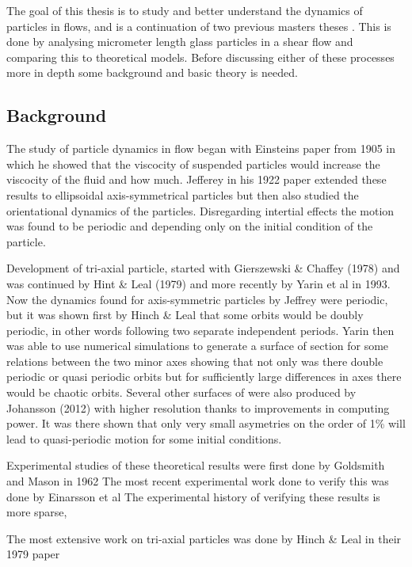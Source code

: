 


The goal of this thesis is to study and better understand the dynamics of particles in flows, and is a continuation of two previous masters theses \cite{AntonThesis}\cite{JonasThesis}. This is done by analysing micrometer length glass particles in a shear flow and comparing this to theoretical models. Before discussing either of these processes more in depth some background and basic theory is needed.

\subsection{Background}
The study of particle dynamics in flow began with Einsteins paper from 1905 \cite{Einstein} in which he showed that the viscocity of suspended particles would increase the viscocity of the fluid and how much. Jefferey in his 1922 paper \cite{Jeffrey} extended these results to ellipsoidal axis-symmetrical particles but then also studied the orientational dynamics of the particles. Disregarding intertial effects the motion was found to be periodic and depending only on the initial condition of the particle.

Development of tri-axial particle, started with Gierszewski \& Chaffey (1978)\cite{Chaffey} and was continued by Hint \& Leal (1979) and more recently by Yarin et al in 1993\cite{Yarin}. 
Now the dynamics found for axis-symmetric particles by Jeffrey were periodic, but it was shown first by Hinch \& Leal that some orbits would be doubly periodic, in other words following two separate independent periods. 
Yarin then was able to use numerical simulations to generate a surface of section \cite{SurfaceOfSection} for some relations between the two minor axes showing that not only was there double periodic or quasi periodic orbits but for sufficiently large differences in axes there would be chaotic orbits. 
Several other surfaces of were also produced by Johansson (2012)\cite{AntonThesis} with higher resolution thanks to improvements in computing power. It was there shown that only very small asymetries on the order of 1\% will lead to quasi-periodic motion for some initial conditions.

Experimental studies of these theoretical results were first done by Goldsmith and Mason in 1962\cite{Mason}
The most recent experimental work done to verify this was done by Einarsson et al \cite{JonasExperiment} 
The experimental history of verifying these results is more sparse, 


The most extensive work on tri-axial particles was done by Hinch \& Leal in their 1979 paper \cite{Leal}
	
